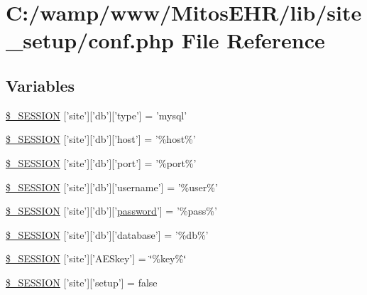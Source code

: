 \hypertarget{lib_2site__setup_2conf_8php}{\section{\-C\-:/wamp/www/\-Mitos\-E\-H\-R/lib/site\-\_\-setup/conf.php \-File \-Reference}
\label{lib_2site__setup_2conf_8php}
}
\subsection*{\-Variables}
\begin{DoxyCompactItemize}
\item 
\hyperlink{lib_2site__setup_2conf_8php_a3a4fa49ab6dddfa9c346db822685ecbe}{\$\-\_\-\-S\-E\-S\-S\-I\-O\-N} \mbox{[}'site'\mbox{]}\mbox{[}'db'\mbox{]}\mbox{[}'type'\mbox{]} = 'mysql'
\item 
\hyperlink{lib_2site__setup_2conf_8php_aa19fa0436dd2ec0b53315caa21c96832}{\$\-\_\-\-S\-E\-S\-S\-I\-O\-N} \mbox{[}'site'\mbox{]}\mbox{[}'db'\mbox{]}\mbox{[}'host'\mbox{]} = '\%host\%'
\item 
\hyperlink{lib_2site__setup_2conf_8php_afa8532c41f4264b9170e9e67f350eb32}{\$\-\_\-\-S\-E\-S\-S\-I\-O\-N} \mbox{[}'site'\mbox{]}\mbox{[}'db'\mbox{]}\mbox{[}'port'\mbox{]} = '\%port\%'
\item 
\hyperlink{lib_2site__setup_2conf_8php_a52abc60f7405711ec86306adcc75bb52}{\$\-\_\-\-S\-E\-S\-S\-I\-O\-N} \mbox{[}'site'\mbox{]}\mbox{[}'db'\mbox{]}\mbox{[}'username'\mbox{]} = '\%user\%'
\item 
\hyperlink{lib_2site__setup_2conf_8php_add5af83c057b1684ddee38e593f49fe3}{\$\-\_\-\-S\-E\-S\-S\-I\-O\-N} \mbox{[}'site'\mbox{]}\mbox{[}'db'\mbox{]}\mbox{[}'\hyperlink{classpassword}{password}'\mbox{]} = '\%pass\%'
\item 
\hyperlink{lib_2site__setup_2conf_8php_ae6d86271937ef718137778389e84c84d}{\$\-\_\-\-S\-E\-S\-S\-I\-O\-N} \mbox{[}'site'\mbox{]}\mbox{[}'db'\mbox{]}\mbox{[}'database'\mbox{]} = '\%db\%'
\item 
\hyperlink{lib_2site__setup_2conf_8php_acdbd078321573ede00f1ba490a914deb}{\$\-\_\-\-S\-E\-S\-S\-I\-O\-N} \mbox{[}'site'\mbox{]}\mbox{[}'\-A\-E\-Skey'\mbox{]} = \char`\"{}\%key\%\char`\"{}
\item 
\hyperlink{lib_2site__setup_2conf_8php_aecebd34109af039a13c90ba0f51db8fc}{\$\-\_\-\-S\-E\-S\-S\-I\-O\-N} \mbox{[}'site'\mbox{]}\mbox{[}'setup'\mbox{]} = false
\end{DoxyCompactItemize}


